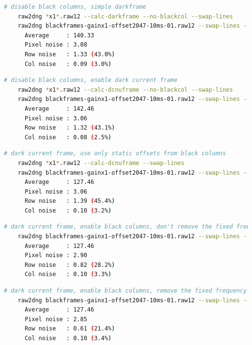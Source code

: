 \begin{lstlisting}[language=bash,morekeywords=$,keywordstyle=\bfseries,frame=none,xleftmargin=.25in,belowskip=2em, aboveskip=2em]
    # disable black columns, simple darkframe
    raw2dng *x1*.raw12 --calc-darkframe --no-blackcol --swap-lines
    raw2dng blackframes-gainx1-offset2047-10ms-01.raw12 --swap-lines --no-blackcol --check-darkframe
      Average     : 140.33
      Pixel noise : 3.08
      Row noise   : 1.33 (43.0%)
      Col noise   : 0.09 (3.0%)
\end{lstlisting}

\begin{lstlisting}[language=bash,morekeywords=$,keywordstyle=\bfseries,frame=none,xleftmargin=.25in,belowskip=2em, aboveskip=2em]
    # disable black columns, enable dark current frame
    raw2dng *x1*.raw12 --calc-dcnuframe --no-blackcol --swap-lines
    raw2dng blackframes-gainx1-offset2047-10ms-01.raw12 --swap-lines --no-blackcol --check-darkframe
      Average     : 142.46
      Pixel noise : 3.06
      Row noise   : 1.32 (43.1%)
      Col noise   : 0.08 (2.5%)
\end{lstlisting}

\begin{lstlisting}[language=bash,morekeywords=$,keywordstyle=\bfseries,frame=none,xleftmargin=.25in,belowskip=2em, aboveskip=2em]
    # dark current frame, use only static offsets from black columns
    raw2dng *x1*.raw12 --calc-dcnuframe --swap-lines
    raw2dng blackframes-gainx1-offset2047-10ms-01.raw12 --swap-lines --no-blackcol-rn --check-darkframe
      Average     : 127.46
      Pixel noise : 3.06
      Row noise   : 1.39 (45.4%)
      Col noise   : 0.10 (3.2%)
\end{lstlisting}

\begin{lstlisting}[language=bash,morekeywords=$,keywordstyle=\bfseries,frame=none,xleftmargin=.25in,belowskip=2em, aboveskip=2em]
    # dark current frame, enable black columns, don't remove the fixed frequency component from black columns
    raw2dng blackframes-gainx1-offset2047-10ms-01.raw12 --swap-lines --no-blackcol-ff --check-darkframe
      Average     : 127.46
      Pixel noise : 2.90
      Row noise   : 0.82 (28.2%)
      Col noise   : 0.10 (3.3%)
\end{lstlisting}

\begin{lstlisting}[language=bash,morekeywords=$,keywordstyle=\bfseries,frame=none,xleftmargin=.25in,belowskip=2em, aboveskip=2em]
    # dark current frame, enable black columns, remove the fixed frequency component (default setting)
    raw2dng blackframes-gainx1-offset2047-10ms-01.raw12 --swap-lines --check-darkframe
      Average     : 127.46
      Pixel noise : 2.85
      Row noise   : 0.61 (21.4%)
      Col noise   : 0.10 (3.4%)
\end{lstlisting}

